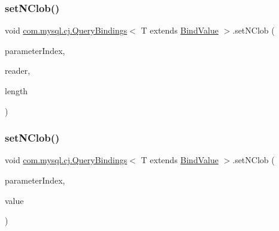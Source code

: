 \subsubsection{\texorpdfstring{set\+N\+Clob()}{setNClob()}\hspace{0.1cm}{\footnotesize\ttfamily [2/3]}}
{\footnotesize\ttfamily void \mbox{\hyperlink{interfacecom_1_1mysql_1_1cj_1_1_query_bindings}{com.\+mysql.\+cj.\+Query\+Bindings}}$<$ T extends \mbox{\hyperlink{interfacecom_1_1mysql_1_1cj_1_1_bind_value}{Bind\+Value}} $>$.set\+N\+Clob (\begin{DoxyParamCaption}\item[{int}]{parameter\+Index,  }\item[{Reader}]{reader,  }\item[{long}]{length }\end{DoxyParamCaption})}

\mbox{\label{interfacecom_1_1mysql_1_1cj_1_1_query_bindings_a64f163d0ed5afff20b74d2cef23754b2}} 
\subsubsection{\texorpdfstring{set\+N\+Clob()}{setNClob()}\hspace{0.1cm}{\footnotesize\ttfamily [3/3]}}
{\footnotesize\ttfamily void \mbox{\hyperlink{interfacecom_1_1mysql_1_1cj_1_1_query_bindings}{com.\+mysql.\+cj.\+Query\+Bindings}}$<$ T extends \mbox{\hyperlink{interfacecom_1_1mysql_1_1cj_1_1_bind_value}{Bind\+Value}} $>$.set\+N\+Clob (\begin{DoxyParamCaption}\item[{int}]{parameter\+Index,  }\item[{N\+Clob}]{value }\end{DoxyParamCaption})}

\mbox{\label{interfacecom_1_1mysql_1_1cj_1_1_query_bindings_a126970d505b9183745100c3daa909e5f}} 
